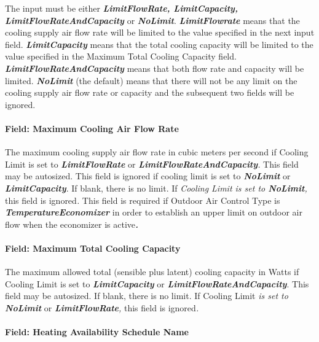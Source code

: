 The input must be either \textbf{\emph{LimitFlowRate, LimitCapacity, LimitFlowRateAndCapacity}} or \textbf{\emph{NoLimit}}. \textbf{\emph{LimitFlowrate}} means that the cooling supply air flow rate will be limited to the value specified in the next input field. \textbf{\emph{LimitCapacity}} means that the total cooling capacity will be limited to the value specified in the Maximum Total Cooling Capacity field. \textbf{\emph{LimitFlowRateAndCapacity}} means that both flow rate and capacity will be limited. \textbf{\emph{NoLimit}} (the default) means that there will not be any limit on the cooling supply air flow rate or capacity and the subsequent two fields will be ignored.

\paragraph{Field: Maximum Cooling Air Flow Rate}\label{field-maximum-cooling-air-flow-rate-001}

The maximum cooling supply air flow rate in cubic meters per second if Cooling Limit is set to \textbf{\emph{LimitFlowRate}} or \textbf{\emph{LimitFlowRateAndCapacity}}\emph{.} This field may be autosized. This field is ignored if cooling limit is set to \textbf{\emph{NoLimit}} or \textbf{\emph{LimitCapacity}}. If blank, there is no limit. If \emph{Cooling Limit is set to \textbf{NoLimit},} this field is ignored\emph{.} This field is required if Outdoor Air Control Type is \textbf{\emph{TemperatureEconomizer}} in order to establish an upper limit on outdoor air flow when the economizer is active\textbf{\emph{.}}

\paragraph{Field: Maximum Total Cooling Capacity}\label{field-maximum-total-cooling-capacity-000}

The maximum allowed total (sensible plus latent) cooling capacity in Watts if Cooling Limit is set to \textbf{\emph{LimitCapacity}} or \textbf{\emph{LimitFlowRateAndCapacity}}. This field may be autosized. If blank, there is no limit. If Cooling Limit \emph{is set to \textbf{NoLimit}} or \textbf{\emph{LimitFlowRate}}\emph{,} this field is ignored\emph{.}

\paragraph{Field: Heating Availability Schedule Name}\label{field-heating-availability-schedule-name-001}

